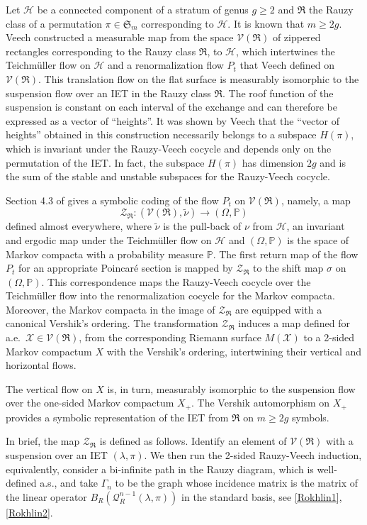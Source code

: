 \documentclass[11pt]{article}
\numberwithin{equation}{section}\newcommand{\Relation}[2][]{}\newtheorem*{prop*}{Proposition}
\let\mathcal\mathscr
\theoremstyle{plain}
\theoremstyle{definition}
\let\wt\widetilde
\let\lam\lambda
\let\Om\Omega
\let\Gam\Gamma
\newcommand\FrR{\mathfrak{R}}
\newcommand\Frs{\mathfrak{S}}
\newcommand\Hk{\mathcal{H}}
\newcommand\Qk{\mathcal{Q}}
\newcommand\Vk{\mathcal{V}}
\newcommand\Xk{\mathcal{X}}
\newcommand\Zk{\mathcal{Z}}
\renewcommand{\P}{\mathbb{P}}
\newcommand\be{\begin{equation}}
\newcommand\ee{\end{equation}}
\begin{document}
Let $\Hk$ be a connected component of a stratum of genus $g\ge 2$ and $\FrR$ the Rauzy class of a permutation $\pi\in \Frs_m$ corresponding to $\Hk$. It is known that $m\ge 2g$.
Veech \cite{veech}
constructed a measurable map from the space $\Vk(\FrR)$ of
zippered rectangles corresponding to the Rauzy class $\FrR$, to $\Hk$, which intertwines the Teichmüller flow on $\Hk$ and a renormalization flow $P_t$ that Veech defined on $\Vk(\FrR)$. This translation flow on the flat surface is measurably isomorphic to the suspension flow over an IET in the Rauzy class $\FrR$. The roof function of the suspension is constant on each interval of the exchange and can therefore be expressed as a vector of ``heights''.
It was shown by Veech \cite{veechamj} that the ``vector of heights'' obtained in this construction necessarily belongs to a subspace $H(\pi)$, which is invariant under the Rauzy-Veech cocycle and depends only on the permutation of the IET. In fact, the subspace $H(\pi)$ has dimension $2g$ and is the sum of the stable and unstable subspaces for the Rauzy-Veech cocycle.

Section 4.3 of \cite{Buf-umn} gives a symbolic coding of the flow $P_t$ on $\Vk(\FrR)$, namely, a map
\be \label{map-veech}
\Zk_{\FrR}: (\Vk(\FrR),\wt\nu) \to (\Om,\P)
\ee
defined almost everywhere, where $\wt\nu$ is the pull-back of $\nu$ from $\Hk$, an invariant and ergodic map under the Teichmüller flow on
$\Hk$ and $(\Om,\P)$ is the space of Markov compacta with a probability measure $\P$.
The first return map of the flow $P_t$ for an appropriate Poincaré section is mapped by $\Zk_\FrR$ to the shift map $\sigma$ on $(\Om,\P)$. This correspondence maps the Rauzy-Veech cocycle over the Teichmüller flow into the renormalization cocycle for the Markov compacta. Moreover, the Markov compacta in the image of $\Zk_{\FrR}$ are equipped with a
canonical Vershik's ordering.
The transformation $\Zk_\FrR$ induces a map defined for a.e.\ $\Xk\in \Vk(\FrR)$, from the corresponding Riemann surface $M(\Xk)$ to a 2-sided Markov compactum $X$ with the Vershik's ordering, intertwining their vertical and horizontal flows.

The vertical flow on $X$ is, in turn, measurably isomorphic to the suspension flow over the one-sided Markov compactum $X_+$. The Vershik automorphism on $X_+$ provides a symbolic representation of the IET from $\FrR$ on $m\ge 2g$ symbols.

In brief, the map $\Zk_\FrR$ is defined as follows. Identify an element of $\Vk(\FrR)$ with a suspension over an IET $(\lam,\pi)$.
We then run the 2-sided Rauzy-Veech induction, equivalently, consider a bi-infinite path in the Rauzy diagram, which is well-defined a.s., and take
$\Gam_n$ to be the graph whose incidence matrix is the matrix of the linear operator $B_R(\Qk^{n-1}_R(\lam,\pi))$ in the standard basis, see \eqref{Rokhlin1}, \eqref{Rokhlin2}.
\end{document}
